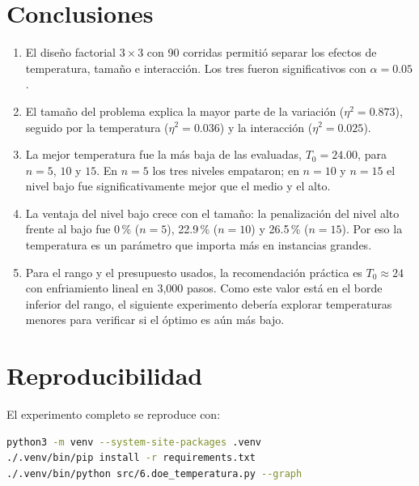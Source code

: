 \documentclass[11pt,letterpaper]{article}
\begin{document}
\section{Conclusiones}

\begin{enumerate}
  \item El diseño factorial $3 \times 3$ con 90 corridas permitió separar los
        efectos de temperatura, tamaño e interacción. Los tres fueron
        significativos con $\alpha = 0.05$.
  \item El tamaño del problema explica la mayor parte de la variación
        ($\eta^2 = 0.873$), seguido por la temperatura ($\eta^2 = 0.036$) y la
        interacción ($\eta^2 = 0.025$).
  \item La mejor temperatura fue la más baja de las evaluadas, $T_0 = 24.00$,
        para $n = 5$, $10$ y $15$. En $n = 5$ los tres niveles empataron; en
        $n = 10$ y $n = 15$ el nivel bajo fue significativamente mejor que el
        medio y el alto.
  \item La ventaja del nivel bajo crece con el tamaño: la penalización del
        nivel alto frente al bajo fue 0\,\% ($n = 5$), 22.9\,\% ($n = 10$) y
        26.5\,\% ($n = 15$). Por eso la temperatura es un parámetro que
        importa más en instancias grandes.
  \item Para el rango y el presupuesto usados, la recomendación práctica es
        $T_0 \approx 24$ con enfriamiento lineal en 3,000 pasos. Como este
        valor está en el borde inferior del rango, el siguiente experimento
        debería explorar temperaturas menores para verificar si el óptimo es
        aún más bajo.
\end{enumerate}

\section{Reproducibilidad}

El experimento completo se reproduce con:

\begin{lstlisting}[language=bash]
python3 -m venv --system-site-packages .venv
./.venv/bin/pip install -r requirements.txt
./.venv/bin/python src/6.doe_temperatura.py --graph
\end{lstlisting}
\end{document}
